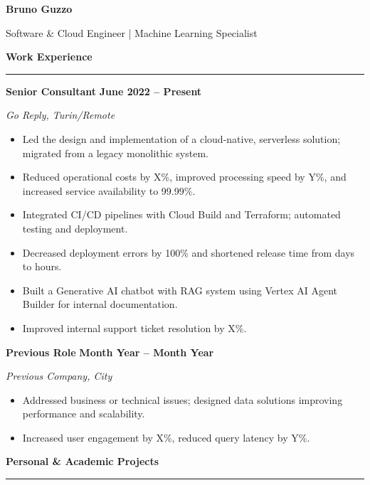 \documentclass[9pt, a4paper]{article}
\newcommand{\cvsection}[1]{%
	\vspace{8pt}\par
	{\Large\bfseries\color{sectionblue}#1}\par
	\vspace{2pt}\hrule\vspace{6pt}
}
\newcommand{\cvsubsection}[3]{%
	\par {\large\bfseries #1} \hfill {\bfseries #2} \par {\textit{#3}} \vspace{4pt}
}
\begin{document}
	
	\begin{center}
		{\Huge\bfseries Bruno Guzzo}\par
		\vspace{4pt}
		{\Large Software \& Cloud Engineer | Machine Learning Specialist}
	\end{center}
	\vspace{10pt}
	
	\begin{minipage}[t]{0.70\linewidth}
		\vspace{0pt} %
		
		\cvsection{Work Experience}
		
		\cvsubsection{Senior Consultant}{June 2022 -- Present}{Go Reply, Turin/Remote}
		
		\begin{itemize}[leftmargin=*, nosep]
			\item Led the design and implementation of a cloud-native, serverless solution; migrated from a legacy monolithic system.
			\item Reduced operational costs by X\%, improved processing speed by Y\%, and increased service availability to 99.99\%.
			\item Integrated CI/CD pipelines with Cloud Build and Terraform; automated testing and deployment.
			\item Decreased deployment errors by 100\% and shortened release time from days to hours.
			\item Built a Generative AI chatbot with RAG system using Vertex AI Agent Builder for internal documentation.
			\item Improved internal support ticket resolution by X\%.
		\end{itemize}
		
		\vspace{6pt}
		\cvsubsection{Previous Role}{Month Year -- Month Year}{Previous Company, City}
		\begin{itemize}[leftmargin=*, nosep]
			\item Addressed business or technical issues; designed data solutions improving performance and scalability.
			\item Increased user engagement by X\%, reduced query latency by Y\%.
		\end{itemize}
		
		\cvsection{Personal \& Academic Projects}
		

\end{minipage}
\end{document}
